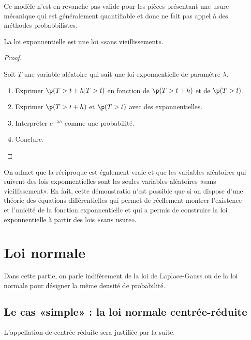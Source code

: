 \documentclass[12pt,a4paper,french]{article}
\begin{document}
Ce modèle n'est en revanche pas valide pour les pièces présentant une
usure mécanique qui est généralement quantifiable et donc ne fait pas
appel à des méthodes probabbilistes.

\begin{proposition}
  La loi exponnentielle est une loi «sans vieillissement».
\end{proposition}
\begin{proof}
  \begin{question}
    Soit $T$ une variable aléatoire qui suit une loi exponnentielle de
    paramètre $\lambda$.
    \begin{enumerate}
      \item Exprimer $\p(T > t+h | T > t)$ en fonction de $\p(T > t+h)$
        et de $\p(T > t)$.
      \item Exprimer $\p(T > t+h)$ et $\p(T > t)$ avec des
        exponnentielles.
      \item Interpréter $e^{-\lambda h}$ comme une probabilité.
      \item Conclure.
    \end{enumerate}
  \end{question}
\end{proof}

On admet que la réciproque est également vraie et que les variables
aléatoires qui suivent des lois exponnentielles sont les seules
variables aléatoires «sans vieillissement». En fait, cette démonstratio
n'est possible que si on dispose d'une théorie des équations
différentielles qui permet de réellement montrer l'existence et
l'unicité de la fonction exponnentielle et qui a permis de construire la
loi exponnentielle à partir des lois «sans usure».

\pagebreak

\section{Loi normale}

Dans cette partie, on parle indiférement de la loi de Laplace-Gauss ou
de la loi normale pour désigner la même densité de probabilité.

\subsection{Le cas «simple» : la loi normale centrée-réduite}

L'appellation de centrée-réduite sera justifiée par la suite.
\end{document}
